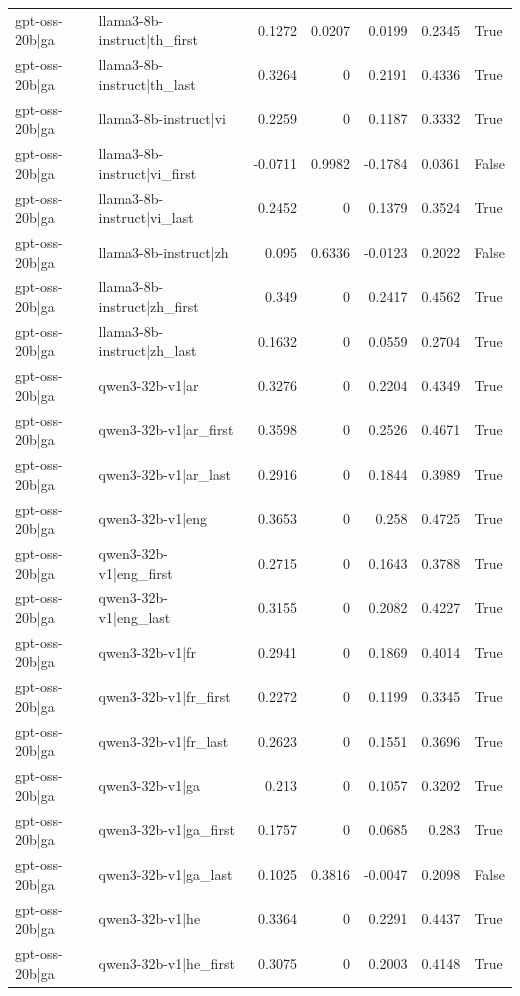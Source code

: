\begin{table}
\begin{tabular}{l l r r r r l}
gpt-oss-20b|ga & llama3-8b-instruct|th_first & 0.1272 & 0.0207 & 0.0199 & 0.2345 & True \\
gpt-oss-20b|ga & llama3-8b-instruct|th_last & 0.3264 & 0 & 0.2191 & 0.4336 & True \\
gpt-oss-20b|ga & llama3-8b-instruct|vi & 0.2259 & 0 & 0.1187 & 0.3332 & True \\
gpt-oss-20b|ga & llama3-8b-instruct|vi_first & -0.0711 & 0.9982 & -0.1784 & 0.0361 & False \\
gpt-oss-20b|ga & llama3-8b-instruct|vi_last & 0.2452 & 0 & 0.1379 & 0.3524 & True \\
gpt-oss-20b|ga & llama3-8b-instruct|zh & 0.095 & 0.6336 & -0.0123 & 0.2022 & False \\
gpt-oss-20b|ga & llama3-8b-instruct|zh_first & 0.349 & 0 & 0.2417 & 0.4562 & True \\
gpt-oss-20b|ga & llama3-8b-instruct|zh_last & 0.1632 & 0 & 0.0559 & 0.2704 & True \\
gpt-oss-20b|ga & qwen3-32b-v1|ar & 0.3276 & 0 & 0.2204 & 0.4349 & True \\
gpt-oss-20b|ga & qwen3-32b-v1|ar_first & 0.3598 & 0 & 0.2526 & 0.4671 & True \\
gpt-oss-20b|ga & qwen3-32b-v1|ar_last & 0.2916 & 0 & 0.1844 & 0.3989 & True \\
gpt-oss-20b|ga & qwen3-32b-v1|eng & 0.3653 & 0 & 0.258 & 0.4725 & True \\
gpt-oss-20b|ga & qwen3-32b-v1|eng_first & 0.2715 & 0 & 0.1643 & 0.3788 & True \\
gpt-oss-20b|ga & qwen3-32b-v1|eng_last & 0.3155 & 0 & 0.2082 & 0.4227 & True \\
gpt-oss-20b|ga & qwen3-32b-v1|fr & 0.2941 & 0 & 0.1869 & 0.4014 & True \\
gpt-oss-20b|ga & qwen3-32b-v1|fr_first & 0.2272 & 0 & 0.1199 & 0.3345 & True \\
gpt-oss-20b|ga & qwen3-32b-v1|fr_last & 0.2623 & 0 & 0.1551 & 0.3696 & True \\
gpt-oss-20b|ga & qwen3-32b-v1|ga & 0.213 & 0 & 0.1057 & 0.3202 & True \\
gpt-oss-20b|ga & qwen3-32b-v1|ga_first & 0.1757 & 0 & 0.0685 & 0.283 & True \\
gpt-oss-20b|ga & qwen3-32b-v1|ga_last & 0.1025 & 0.3816 & -0.0047 & 0.2098 & False \\
gpt-oss-20b|ga & qwen3-32b-v1|he & 0.3364 & 0 & 0.2291 & 0.4437 & True \\
gpt-oss-20b|ga & qwen3-32b-v1|he_first & 0.3075 & 0 & 0.2003 & 0.4148 & True \\

\end{tabular}
\end{table}
